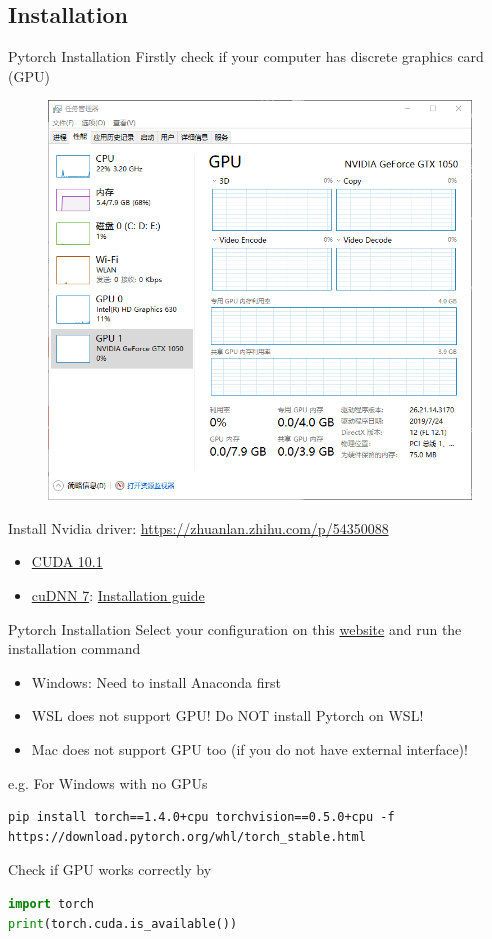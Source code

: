 \documentclass{../TexTemplate/myslide}
\begin{document}
\subsection{Installation}
\begin{frame}{Pytorch Installation}
Firstly check if your computer has discrete graphics card (GPU)
\begin{figure}
\centering
\includegraphics[width=0.45\linewidth]{fig/gpu-monitor.png}
\end{figure}
Install Nvidia driver: \url{https://zhuanlan.zhihu.com/p/54350088}
\begin{itemize}
	\item \href{https://developer.nvidia.com/cuda-10.1-download-archive-base}{CUDA 10.1}
	\item \href{https://developer.nvidia.com/cudnn}{cuDNN 7}: \href{https://docs.nvidia.com/deeplearning/sdk/cudnn-install/index.html}{Installation guide}
\end{itemize}
\end{frame}

\begin{frame}[fragile]{Pytorch Installation}
Select your configuration on this \href{https://pytorch.org/}{website} and run the installation command
\begin{itemize}
	\item Windows: Need to install Anaconda first
	\item WSL does not support GPU! Do NOT install Pytorch on WSL!
	\item Mac does not support GPU too (if you do not have external interface)!
\end{itemize}
e.g. For Windows with no GPUs
\begin{lstlisting}
pip install torch==1.4.0+cpu torchvision==0.5.0+cpu -f https://download.pytorch.org/whl/torch_stable.html
\end{lstlisting}
Check if GPU works correctly by
\begin{lstlisting}[language=python]
import torch
print(torch.cuda.is_available())
\end{lstlisting}
\end{frame}
\end{document}
